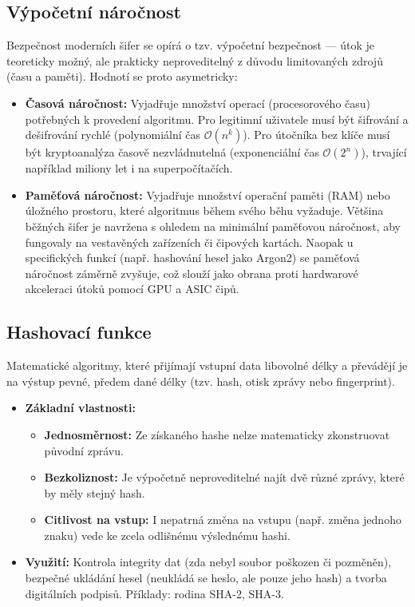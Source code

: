 \subsection{Výpočetní náročnost}
Bezpečnost moderních šifer se opírá o tzv. výpočetní bezpečnost — útok je teoreticky možný, ale prakticky neproveditelný z důvodu limitovaných zdrojů (času a paměti). Hodnotí se proto asymetricky:
\begin{itemize}
    \item \textbf{Časová náročnost:} Vyjadřuje množství operací (procesorového času) potřebných k provedení algoritmu. Pro legitimní uživatele musí být šifrování a dešifrování rychlé (polynomiální čas $\mathcal{O}(n^k)$). Pro útočníka bez klíče musí být kryptoanalýza časově nezvládnutelná (exponenciální čas $\mathcal{O}(2^n)$), trvající například miliony let i na superpočítačích.
    \item \textbf{Paměťová náročnost:} Vyjadřuje množství operační paměti (RAM) nebo úložného prostoru, které algoritmus během svého běhu vyžaduje. Většina běžných šifer je navržena s ohledem na minimální paměťovou náročnost, aby fungovaly na vestavěných zařízeních či čipových kartách. Naopak u specifických funkcí (např. hashování hesel jako Argon2) se paměťová náročnost záměrně zvyšuje, což slouží jako obrana proti hardwarové akceleraci útoků pomocí GPU a ASIC čipů.
\end{itemize}

\subsection{Hashovací funkce}
Matematické algoritmy, které přijímají vstupní data libovolné délky a převádějí je na výstup pevné, předem dané délky (tzv. hash, otisk zprávy nebo fingerprint).
\begin{itemize}
    \item \textbf{Základní vlastnosti:}
    \begin{itemize}
        \item \textbf{Jednosměrnost:} Ze získaného hashe nelze matematicky zkonstruovat původní zprávu.
        \item \textbf{Bezkoliznost:} Je výpočetně neproveditelné najít dvě různé zprávy, které by měly stejný hash.
        \item \textbf{Citlivost na vstup:} I nepatrná změna na vstupu (např. změna jednoho znaku) vede ke zcela odlišnému výslednému hashi.
    \end{itemize}
    \item \textbf{Využití:} Kontrola integrity dat (zda nebyl soubor poškozen či pozměněn), bezpečné ukládání hesel (neukládá se heslo, ale pouze jeho hash) a tvorba digitálních podpisů. Příklady: rodina SHA-2, SHA-3.
\end{itemize}

